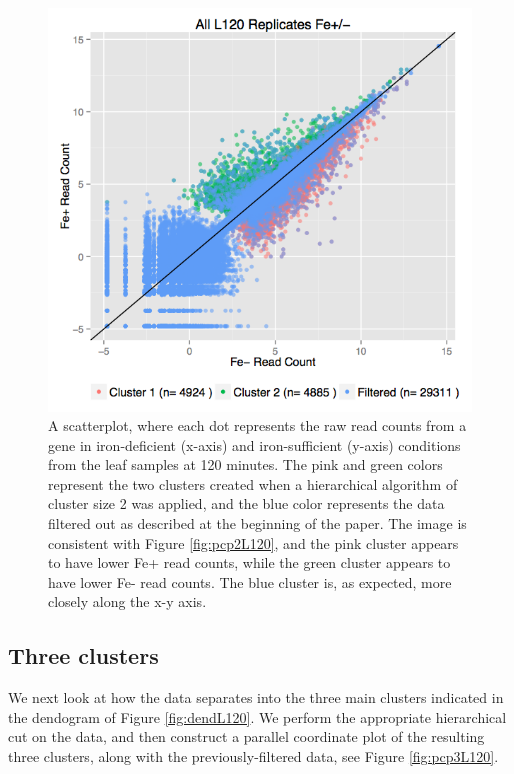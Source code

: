 \documentclass[11pt,a4paper,oldfontcommands,openany]{memoir}
\numberwithin{equation}{section} %
\begin{document}
\begin{figure}[H]
    \begin{framed}
    \centering
    \includegraphics[width=\textwidth]{scatterL120}
    \end{framed}
    \caption{A scatterplot, where each dot represents the raw read counts from a gene in iron-deficient (x-axis) and iron-sufficient (y-axis) conditions from the leaf samples at 120 minutes. The pink and green colors represent the two clusters created when a hierarchical algorithm of cluster size 2 was applied, and the blue color represents the data filtered out as described at the beginning of the paper. The image is consistent with Figure \ref{fig:pcp2L120}, and the pink cluster appears to have lower Fe+ read counts, while the green cluster appears to have lower Fe- read counts. The blue cluster is, as expected, more closely along the x-y axis.}
    \label{fig:scatterL120}
\end{figure}

\subsection{Three clusters}

We next look at how the data separates into the three main clusters indicated in the dendogram of Figure \ref{fig:dendL120}. We perform the appropriate hierarchical cut on the data, and then construct a parallel coordinate plot of the resulting three clusters, along with the previously-filtered data, see Figure \ref{fig:pcp3L120}.
\end{document}
